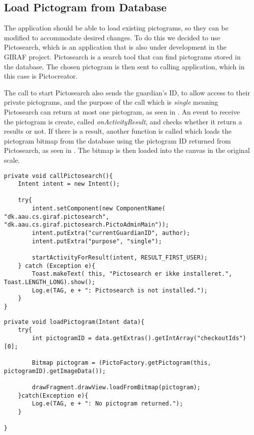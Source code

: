 \subsection{Load Pictogram from Database}
The application should be able to load existing pictograms, so they can be modified to accommodate desired changes.
To do this we decided to use Pictosearch, which is an application that is also under development in the GIRAF project.
Pictosearch is a search tool that can find pictograms stored in the database.
The chosen pictogram is then sent to calling application, which in this case is Pictocreator.

The call to start Pictosearch also sends the guardian's ID, to allow access to their private pictograms, and the purpose of the call which is \textit{single} meaning Pictosearch can return at most one pictogram, as seen in .
An event to receive the pictogram is create, called \textit{onActivityResult}, and checks whether it return a results or not.
If there is a result, another function is called which loads the pictogram bitmap from the database using the pictogram ID returned from Pictosearch, as seen in .
The bitmap is then loaded into the canvas in the original scale.

\begin{lstlisting}[caption=Method used to launch Pictosearch., label=lst:callPictosearch]
private void callPictosearch(){
    Intent intent = new Intent();

    try{
        intent.setComponent(new ComponentName( "dk.aau.cs.giraf.pictosearch",  "dk.aau.cs.giraf.pictosearch.PictoAdminMain"));
        intent.putExtra("currentGuardianID", author);
        intent.putExtra("purpose", "single");

        startActivityForResult(intent, RESULT_FIRST_USER);
    } catch (Exception e){
        Toast.makeText( this, "Pictosearch er ikke installeret.", Toast.LENGTH_LONG).show();
        Log.e(TAG, e + ": Pictosearch is not installed.");
    }
}
\end{lstlisting}

\begin{lstlisting}[caption=Method to load a pictogram from Id received from Pictosearch, label=lst:loadPictogram]
private void loadPictogram(Intent data){
    try{
        int pictogramID = data.getExtras().getIntArray("checkoutIds")[0];

        Bitmap pictogram = (PictoFactory.getPictogram(this, pictogramID).getImageData());

        drawFragment.drawView.loadFromBitmap(pictogram);
    }catch(Exception e){
        Log.e(TAG, e + ": No pictogram returned.");
    }

}
\end{lstlisting}

